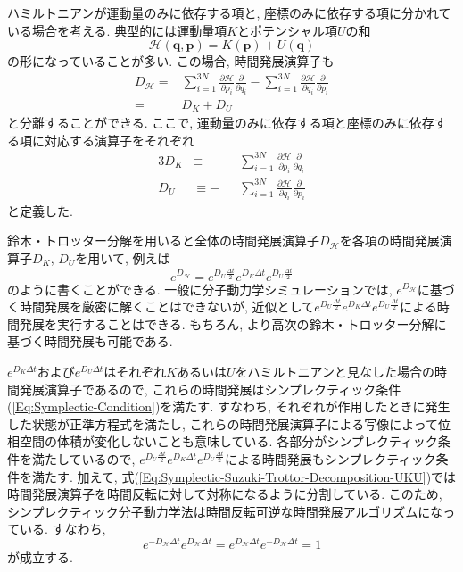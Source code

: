 ハミルトニアンが運動量のみに依存する項と, 座標のみに依存する項に分かれている場合を考える. 典型的には運動量項$K$とポテンシャル項$U$の和
\begin{equation}
  \mathcal{H}(\bm{q}, \bm{p})
  =
  K(\bm{p}) + U(\bm{q})
\end{equation}
の形になっていることが多い. 
この場合, 時間発展演算子も
\begin{align}
  D_{\mathcal{H}}
  =&
  \sum_{i=1}^{3N}
  \frac{\partial \mathcal{H}}{\partial p_{i}}
  \frac{\partial}{\partial q_{i}}
  -
  \sum_{i=1}^{3N}
  \frac{\partial \mathcal{H}}{\partial q_{i}}
  \frac{\partial}{\partial p_{i}}
  \\
  =&
  D_{K} + D_{U}
\end{align}
と分離することができる. ここで, 運動量のみに依存する項と座標のみに依存する項に対応する演算子をそれぞれ
\begin{alignat}{3}
  D_{K}
  &\equiv&&
  \sum_{i=1}^{3N}
  \frac{\partial \mathcal{H}}{\partial p_{i}}
  \frac{\partial}{\partial q_{i}}
  \label{Eq:Symplectic-Definition-DK}
  \\
  D_{U}
  &\equiv
  -&&
  \sum_{i=1}^{3N}
  \frac{\partial \mathcal{H}}{\partial q_{i}}
  \frac{\partial}{\partial p_{i}}
  \label{Eq:Symplectic-Definition-DU}
\end{alignat}
と定義した. 

鈴木・トロッター分解を用いると全体の時間発展演算子$D_{\mathcal{H}}$を各項の時間発展演算子$D_{K}$, $D_{U}$を用いて, 例えば
\begin{equation}
  e^{D_{\mathcal{H}}}
  =
  e^{D_{U} \frac{\Delta t}{2}}
  e^{D_{K} \Delta t}
  e^{D_{U} \frac{\Delta t}{2}}
  \label{Eq:Symplectic-Suzuki-Trottor-Decomposition-UKU}
\end{equation}
のように書くことができる. 
一般に分子動力学シミュレーションでは, $e^{D_{\mathcal{H}}}$に基づく時間発展を厳密に解くことはできないが, 近似として$e^{D_{U} \frac{\Delta t}{2}}e^{D_{K} \Delta t}e^{D_{U} \frac{\Delta t}{2}}$による時間発展を実行することはできる. もちろん, より高次の鈴木・トロッター分解に基づく時間発展も可能である. 

$e^{D_{K} \Delta t}$および$e^{D_{U} \Delta t}$はそれぞれ$K$あるいは$U$をハミルトニアンと見なした場合の時間発展演算子であるので, これらの時間発展はシンプレクティック条件(\ref{Eq:Symplectic-Condition})を満たす. すなわち, それぞれが作用したときに発生した状態が正準方程式を満たし, これらの時間発展演算子による写像によって位相空間の体積が変化しないことも意味している. 各部分がシンプレクティック条件を満たしているので, $e^{D_{U} \frac{\Delta t}{2}}e^{D_{K} \Delta t}e^{D_{U} \frac{\Delta t}{2}}$による時間発展もシンプレクティック条件を満たす. 加えて, 式(\ref{Eq:Symplectic-Suzuki-Trottor-Decomposition-UKU})では時間発展演算子を時間反転に対して対称になるように分割している.
このため, シンプレクティック分子動力学法は時間反転可逆な時間発展アルゴリズムになっている.
すなわち,
\begin{equation}
  e^{-D_{\mathcal{H}} \Delta t}
  e^{ D_{\mathcal{H}} \Delta t}
  =
  e^{ D_{\mathcal{H}} \Delta t}
  e^{-D_{\mathcal{H}} \Delta t}
  = 1
\end{equation}
が成立する.

